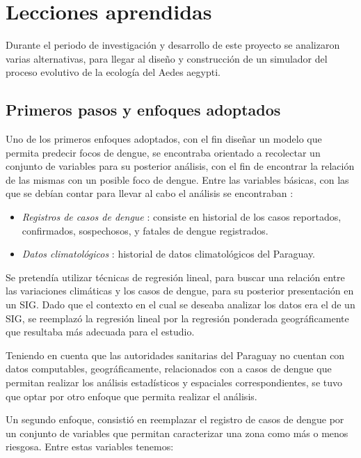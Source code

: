 \chapter{Lecciones aprendidas}
Durante el periodo de investigación y desarrollo de este proyecto se analizaron varias
alternativas, para llegar al diseño y construcción de un simulador del proceso evolutivo de la
ecología del Aedes aegypti.

\section{Primeros pasos y enfoques adoptados}
Uno de los primeros enfoques adoptados, con el fin diseñar un modelo que permita predecir focos de
dengue, se encontraba orientado a recolectar un conjunto de variables para su posterior análisis,
con el fin de encontrar la relación de las mismas con un posible foco de dengue. Entre las
variables básicas, con las que se debían contar para llevar al cabo el análisis se encontraban :

\begin{itemize}
    \item \textit{Registros de casos de dengue} : consiste en historial de los casos reportados, confirmados, sospechosos, y fatales de dengue registrados.

    \item \textit{Datos climatológicos} : historial de datos climatológicos del Paraguay.
\end{itemize}

Se pretendía utilizar técnicas de regresión lineal, para buscar una relación entre las variaciones
climáticas y los casos de dengue, para su posterior presentación en un SIG. Dado que el contexto
en el cual se deseaba analizar los datos era el de un SIG, se reemplazó la regresión lineal por la
regresión ponderada geográficamente que resultaba más adecuada para el estudio.

Teniendo en cuenta que las autoridades sanitarias del Paraguay no cuentan con datos computables,
geográficamente, relacionados con a casos de dengue que permitan realizar los análisis
estadísticos y espaciales correspondientes, se tuvo que optar por otro enfoque que permita
realizar el análisis.

Un segundo enfoque, consistió en reemplazar el registro de casos de dengue por un conjunto de
variables que permitan caracterizar una zona como más o menos riesgosa. Entre estas variables
tenemos:

